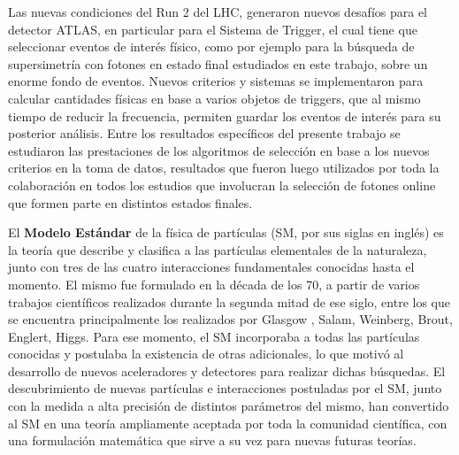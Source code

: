 Las nuevas condiciones del Run 2 del LHC, generaron nuevos desafíos para el detector ATLAS, en particular para el Sistema de Trigger, el cual tiene que seleccionar eventos de interés físico, como por ejemplo para la búsqueda de supersimetría con fotones en estado final estudiados en este trabajo, sobre un enorme fondo de eventos. Nuevos criterios y sistemas se implementaron para calcular cantidades físicas en base a varios objetos de triggers, que al mismo tiempo de reducir la frecuencia, permiten guardar los eventos de interés para su posterior análisis. Entre los resultados específicos del presente trabajo se estudiaron las prestaciones de los algoritmos de selección en base a los nuevos criterios en la toma de datos, resultados que fueron luego utilizados por toda la colaboración en todos los estudios que involucran la selección de fotones online que formen parte en distintos estados finales. 


El \textbf{Modelo Estándar} de la física de partículas (SM, por sus siglas en inglés) es la teoría que describe y clasifica a las partículas elementales de la naturaleza, junto con tres de las cuatro interacciones fundamentales conocidas hasta el momento. El mismo fue formulado en la década de los 70, a partir de varios trabajos científicos realizados durante la segunda mitad de ese siglo, entre los que se encuentra principalmente los realizados por Glasgow \cite{Glashow:1961tr}, Salam\cite{salam}, Weinberg\cite{PhysRevLett.19.1264}, Brout, Englert, Higgs\cite{PhysRevLett.13.321, PhysRevLett.13.508,PhysRevLett.13.585}. Para ese momento, el SM incorporaba a todas las partículas conocidas y postulaba la existencia de otras adicionales, lo que motivó al desarrollo de nuevos aceleradores y detectores para realizar dichas búsquedas. El descubrimiento de nuevas partículas e interacciones postuladas por el SM, junto con la medida a alta precisión de distintos parámetros del mismo, han convertido al SM en una teoría ampliamente aceptada por toda la comunidad científica, con una formulación matemática que sirve a su vez para nuevas futuras teorías.


